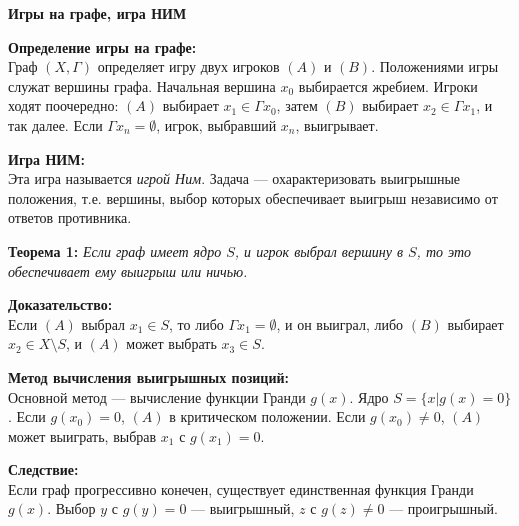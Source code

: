 \textbf{Игры на графе, игра НИМ}

\noindent\textbf{Определение игры на графе:} \\
Граф $(X, \Gamma)$ определяет игру двух игроков $(A)$ и $(B)$. Положениями игры служат вершины графа. Начальная вершина $x_0$ выбирается жребием. Игроки ходят поочередно: $(A)$ выбирает $x_1 \in \Gamma x_0$, затем $(B)$ выбирает $x_2 \in \Gamma x_1$, и так далее. Если $\Gamma x_n = \emptyset$, игрок, выбравший $x_n$, выигрывает.

\noindent\textbf{Игра НИМ:} \\
Эта игра называется \textit{игрой Ним}. Задача — охарактеризовать выигрышные положения, т.е. вершины, выбор которых обеспечивает выигрыш независимо от ответов противника.

\noindent\textbf{Теорема 1:} \textit{Если граф имеет ядро $S$, и игрок выбрал вершину в $S$, то это обеспечивает ему выигрыш или ничью.}

\noindent\textbf{Доказательство:} \\
Если $(A)$ выбрал $x_1 \in S$, то либо $\Gamma x_1 = \emptyset$, и он выиграл, либо $(B)$ выбирает $x_2 \in X \setminus S$, и $(A)$ может выбрать $x_3 \in S$.

\noindent\textbf{Метод вычисления выигрышных позиций:} \\
Основной метод — вычисление функции Гранди $g(x)$. Ядро $S = \{ x | g(x) = 0 \}$. Если $g(x_0) = 0$, $(A)$ в критическом положении. Если $g(x_0) \neq 0$, $(A)$ может выиграть, выбрав $x_1$ с $g(x_1) = 0$.

\noindent\textbf{Следствие:} \\
Если граф прогрессивно конечен, существует единственная функция Гранди $g(x)$. Выбор $y$ с $g(y) = 0$ — выигрышный, $z$ с $g(z) \neq 0$ — проигрышный.

